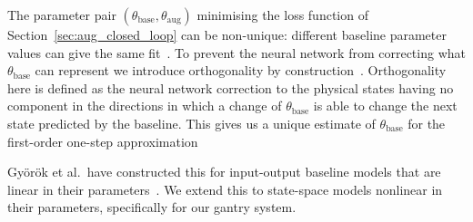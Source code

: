 The parameter pair $(\theta_{\mathrm{base}},\theta_{\mathrm{aug}})$
minimising the loss function of Section~\ref{sec:aug_closed_loop} can be non-unique:
different baseline parameter values can give the same fit~\cite[Sec.~3.1]{gyorok2026obc}.
To prevent the neural network from correcting what $\theta_{\mathrm{base}}$ 
can represent we introduce orthogonality by construction~\cite{gyorok2026obc}.
Orthogonality here is defined as the neural network correction to the
physical states having no component in the directions in which a change of
$\theta_{\mathrm{base}}$ is able to change the next state predicted by the baseline.
This gives us a unique estimate of $\theta_{\mathrm{base}}$ for the first-order one-step approximation

Gy\"or\"ok et al.\ have constructed this for input-output baseline models that
are linear in their parameters~\cite[Sec.~2]{gyorok2026obc}.
We extend this to state-space models nonlinear in their parameters,
specifically for our gantry system.


